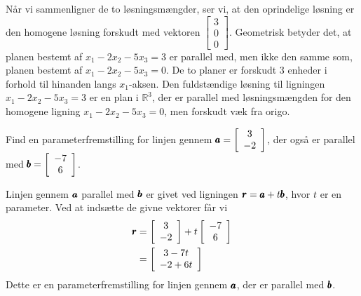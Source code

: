 \begin{solution}
        Når vi sammenligner de to løsningsmængder, ser vi, at den oprindelige løsning er den homogene løsning forskudt med vektoren \(\begin{bmatrix} 3 \\ 0 \\ 0 \end{bmatrix}\). Geometrisk betyder det, at planen bestemt af \( x_1 - 2 x_2 - 5 x_3 = 3 \) er parallel med, men ikke den samme som, planen bestemt af \( x_1 - 2 x_2 - 5 x_3 = 0 \). De to planer er forskudt 3 enheder i forhold til hinanden langs \( x_1 \)-aksen. Den fuldstændige løsning til ligningen \( x_1 - 2 x_2 - 5 x_3 = 3 \) er en plan i \(\mathbb{R}^3\), der er parallel med løsningsmængden for den homogene ligning \( x_1 - 2 x_2 - 5 x_3 = 0 \), men forskudt væk fra origo. \end{solution}

        \begin{example} Find en parameterfremstilling for linjen gennem $\pmb{a}=\left[\begin{array}{c}3 \\ -2\end{array}\right]$, der også er parallel med $\pmb{b}=\left[\begin{array}{c}-7 \\ 6\end{array}\right]$.
        \end{example}

        \begin{solution}
            Linjen gennem $\pmb{a}$ parallel med $\pmb{b}$ er givet ved ligningen $\pmb{r}=\pmb{a}+t \pmb{b}$, hvor $t$ er en parameter. Ved at indsætte de givne vektorer får vi
            \[
            \begin{aligned}
            \pmb{r} &=\left[\begin{array}{c}
            3 \\
            -2
            \end{array}\right]+t\left[\begin{array}{c}
            -7 \\
            6
            \end{array}\right] \\
            &=\left[\begin{array}{c}
            3-7 t \\
            -2+6 t
            \end{array}\right]
            \end{aligned}
            \]
            Dette er en parameterfremstilling for linjen gennem $\pmb{a}$, der er parallel med $\pmb{b}$.
        \end{solution}

